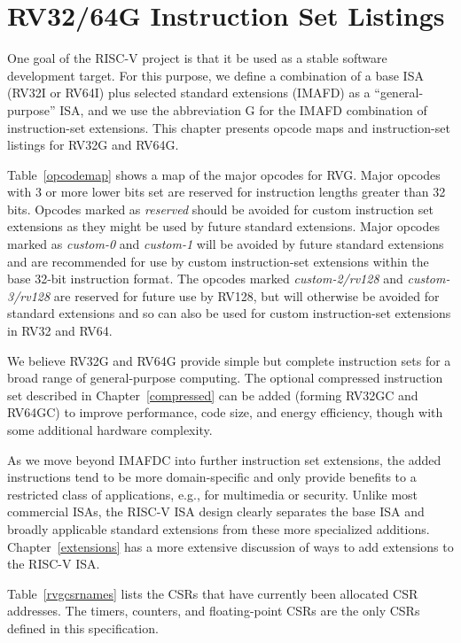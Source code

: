 \chapter{RV32/64G Instruction Set Listings}

One goal of the RISC-V project is that it be used as a stable software
development target.  For this purpose, we define a combination of a
base ISA (RV32I or RV64I) plus selected standard extensions (IMAFD) as
a ``general-purpose'' ISA, and we use the abbreviation G for the IMAFD
combination of instruction-set extensions.    This chapter presents
opcode maps and instruction-set listings for RV32G and RV64G.



Table~\ref{opcodemap} shows a map of the major opcodes for RVG.  Major
opcodes with 3 or more lower bits set are reserved for instruction
lengths greater than 32 bits.  Opcodes marked as {\em reserved} should
be avoided for custom instruction set extensions as they might be used
by future standard extensions.  Major opcodes marked as {\em custom-0}
and {\em custom-1} will be avoided by future standard extensions and
are recommended for use by custom instruction-set extensions within
the base 32-bit instruction format.  The opcodes marked {\em
  custom-2/rv128} and {\em custom-3/rv128} are reserved for future use
by RV128, but will otherwise be avoided for standard extensions and so
can also be used for custom instruction-set extensions in RV32 and
RV64.

We believe RV32G and RV64G provide simple but complete instruction
sets for a broad range of general-purpose computing.  The optional
compressed instruction set described in Chapter~\ref{compressed} can
be added (forming RV32GC and RV64GC) to improve performance, code
size, and energy efficiency, though with some additional hardware
complexity.

As we move beyond IMAFDC into further instruction set extensions, the
added instructions tend to be more domain-specific and only provide
benefits to a restricted class of applications, e.g., for multimedia
or security.  Unlike most commercial ISAs, the RISC-V ISA design
clearly separates the base ISA and broadly applicable standard
extensions from these more specialized additions.
Chapter~\ref{extensions} has a more extensive discussion of ways to
add extensions to the RISC-V ISA.



\FloatBarrier
Table~\ref{rvgcsrnames} lists the CSRs that have
currently been allocated CSR addresses.  The timers, counters, and
floating-point CSRs are the only CSRs defined in this specification.

